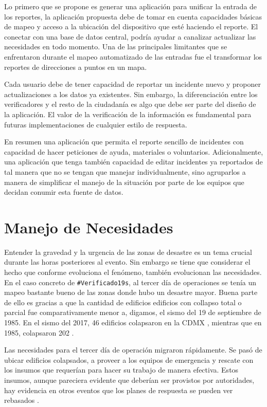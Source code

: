 \documentclass[12pt,spanish,oneside,breaklinks]{book}
\begin{document}
Lo primero que se propone es generar una aplicación para unificar la entrada de los reportes, la aplicación propuesta debe de tomar en cuenta capacidades básicas de mapeo y acceso a la ubicación del dispositivo que esté haciendo el reporte. El conectar con una base de datos central, podría ayudar a canalizar actualizar las necesidades en todo momento. Una de las principales limitantes que se enfrentaron durante el mapeo automatizado de las entradas fue el transformar los reportes de direcciones a puntos en un mapa.

Cada usuario debe de tener capacidad de reportar un incidente nuevo y proponer actualizaciones a los datos ya existentes. Sin embargo, la diferenciación entre los verificadores y el resto de la ciudadanía es algo que debe ser parte del diseño de la aplicación. El valor de la verificación de la información es fundamental para futuras implementaciones de cualquier estilo de respuesta.

En resumen una aplicación que permita el reporte sencillo de incidentes con capacidad de hacer peticiones de ayuda, materiales o voluntarios. Adicionalmente, una aplicación que tenga también capacidad de editar incidentes ya reportados de tal manera que no se tengan que manejar individualmente, sino agruparlos a manera de simplificar el manejo de la situación por parte de los equipos que decidan conumir esta fuente de datos.

\section{Manejo de Necesidades}
\label{sec:orgb4f03ad}

Entender la gravedad y la urgencia de las zonas de desastre es un tema crucial durante las horas posteriores al evento. Sin embargo se tiene que considerar el hecho que conforme evoluciona el fenómeno, también evolucionan las necesidades. En el caso concreto de \texttt{\#Verificado19s}, al tercer día de operaciones se tenía un mapeo bastante bueno de las zonas donde hubo un desastre mayor. Buena parte de ello es gracias a que la cantidad de edificios edificios con collapso total o parcial fue comparativamente menor a, digamos, el sismo del 19 de septiembre de 1985. En el sismo del 2017, 46 edificios colapsaron en la CDMX \cite{Alberto2018}, mientras que en 1985, colapsaron 202 \cite{verde1991}.

Las necesidades para el tercer día de operación migraron rápidamente. Se pasó de ubicar edificios colapsados, a proveer a los equipos de emergencia y rescate con los insumos que requerían para hacer su trabajo de manera efectiva. Estos insumos, aunque pareciera evidente que deberían ser provistos por autoridades, hay evidencia en otros eventos que los planes de respuesta se pueden ver rebasados \cite{coord}.
\end{document}
